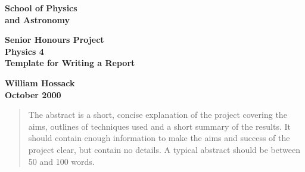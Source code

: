 \documentclass[a4paper,12pt]{article}
\begin{document}
\pagestyle{empty}                       %
\begin{minipage}[b]{110mm}
        {\Huge\bf School of Physics\\ and Astronomy
        \vspace*{17mm}}
\end{minipage}
\hfill
\begin{minipage}[t]{40mm}               
\end{minipage}
\par\noindent                                           %
\vspace*{2cm}
\begin{center}
        \Large\bf \Large\bf Senior Honours Project\\
        \Large\bf Physics 4\\[10pt]                     %
        \LARGE\bf Template for Writing a Report         %
\end{center}
\vspace*{0.5cm}
\begin{center}
        \bf William Hossack\\                           %
        October 2000                                    %
\end{center}
\vspace*{5mm}
%
%                       
\begin{abstract}
        The abstract is a short, concise explanation of the project
        covering the aims, outlines of techniques used and a short
        summary of the results. It should contain enough information to
        make the aims and success of the project clear, but contain no details.
        A typical abstract should be between 50 and 100 words.
\end{abstract}
\end{document}
